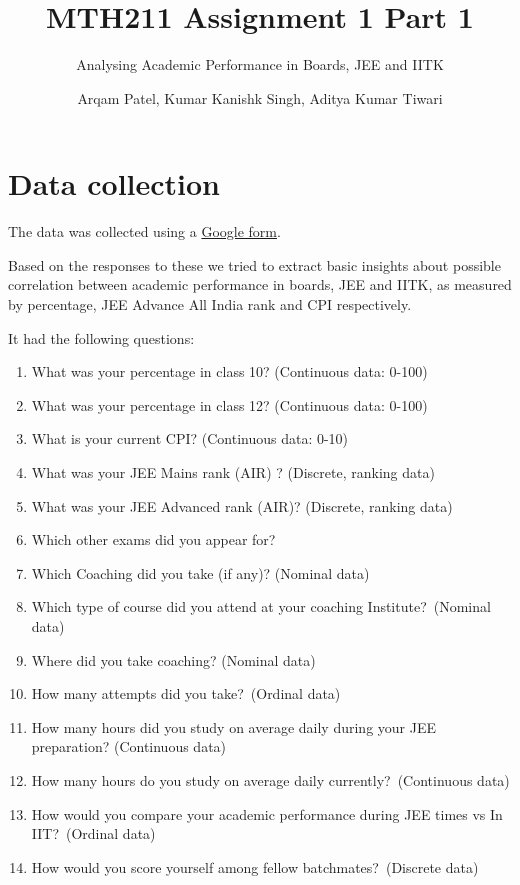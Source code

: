 \documentclass[
  letterpaper,
  DIV=11,
  numbers=noendperiod]{scrartcl}
\title{MTH211 Assignment 1 Part 1}
\subtitle{Analysing Academic Performance in Boards, JEE and IITK}
\author{Arqam Patel, Kumar Kanishk Singh, Aditya Kumar Tiwari}
\date{}
\providecommand{\tightlist}{%
  \setlength{\itemsep}{0pt}\setlength{\parskip}{0pt}}\usepackage{longtable,booktabs,array}
\renewcommand*\contentsname{Table of contents}
\newcommand\contentsname{Table of contents}
\begin{document}
\maketitle
\ifdefined\Shaded\renewenvironment{Shaded}{\begin{tcolorbox}[enhanced, interior hidden, sharp corners, boxrule=0pt, borderline west={3pt}{0pt}{shadecolor}, frame hidden, breakable]}{\end{tcolorbox}}\fi

\renewcommand*\contentsname{Table of contents}
{
\hypersetup{linkcolor=}
\setcounter{tocdepth}{3}
\tableofcontents
}
\hypertarget{data-collection}{%
\section{Data collection}\label{data-collection}}

The data was collected using a
\href{https://docs.google.com/forms/d/e/1FAIpQLSed7HoFO2fe1waPy8_l55DD_4hx3z9IlTguyRA7BvAb6YVOvA/viewform}{Google
form}.

Based on the responses to these we tried to extract basic insights about
possible correlation between academic performance in boards, JEE and
IITK, as measured by percentage, JEE Advance All India rank and CPI
respectively.

It had the following questions:

\begin{enumerate}
\def\labelenumi{\arabic{enumi}.}
\tightlist
\item
  What was your percentage in class 10? (Continuous data: 0-100)
\item
  What was your percentage in class 12? (Continuous data: 0-100)
\item
  What is your current CPI? (Continuous data: 0-10)
\item
  What was your JEE Mains rank (AIR) ? (Discrete, ranking data)
\item
  What was your JEE Advanced rank (AIR)? (Discrete, ranking data)
\item
  Which other exams did you appear for?
\item
  Which Coaching did you take (if any)? (Nominal data)
\item
  Which type of course did you attend at your coaching
  Institute?~(Nominal data)
\item
  Where did you take coaching? (Nominal data)
\item
  How many attempts did you take?~(Ordinal data)
\item
  How many hours did you study on average daily during your JEE
  preparation? (Continuous data)
\item
  How many hours do you study on average daily currently?~(Continuous
  data)
\item
  How would you compare your academic performance during JEE times vs In
  IIT?~(Ordinal data)
\item
  How would you score yourself among fellow batchmates?~(Discrete data)
\end{enumerate}
\end{document}
